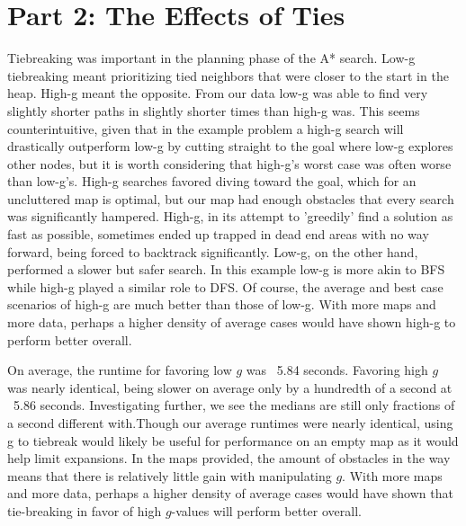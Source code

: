 \documentclass[a4paper,12pt]{article}
\begin{document}
\section{Part 2: The Effects of Ties}
Tiebreaking was important in the planning phase of the A* search. Low-g tiebreaking meant prioritizing tied neighbors that were closer to the start in the heap. High-g meant the opposite. From our data low-g was able to find very slightly shorter paths in slightly shorter times than high-g was. This seems counterintuitive, given that in the example problem a high-g search will drastically outperform low-g by cutting straight to the goal where low-g explores other nodes, but it is worth considering that high-g's worst case was often worse than low-g's. High-g searches favored diving toward the goal, which for an uncluttered map is optimal, but our map had enough obstacles that every search was significantly hampered. High-g, in its attempt to 'greedily' find a solution as fast as possible, sometimes ended up trapped in dead end areas with no way forward, being forced to backtrack significantly. Low-g, on the other hand, performed a slower but safer search. In this example low-g is more akin to BFS while high-g played a similar role to DFS. Of course, the average and best case scenarios of high-g are much better than those of low-g. With more maps and more data, perhaps a higher density of average cases would have shown high-g to perform better overall.

On average, the runtime for favoring low $g$ was ~5.84 seconds. Favoring high $g$ was nearly identical, being slower on average only by a hundredth of a second at ~5.86 seconds. Investigating further, we see the medians are still only fractions of a second different with.Though our average runtimes were nearly identical, using g to tiebreak would likely be useful for performance on an empty map as it would help limit expansions. In the maps provided, the amount of obstacles in the way means that there is relatively little gain with manipulating $g$. With more maps and more data, perhaps a higher density of average cases would have shown that tie-breaking in favor of high $g$-values will perform better overall.
 	
\end{document}
